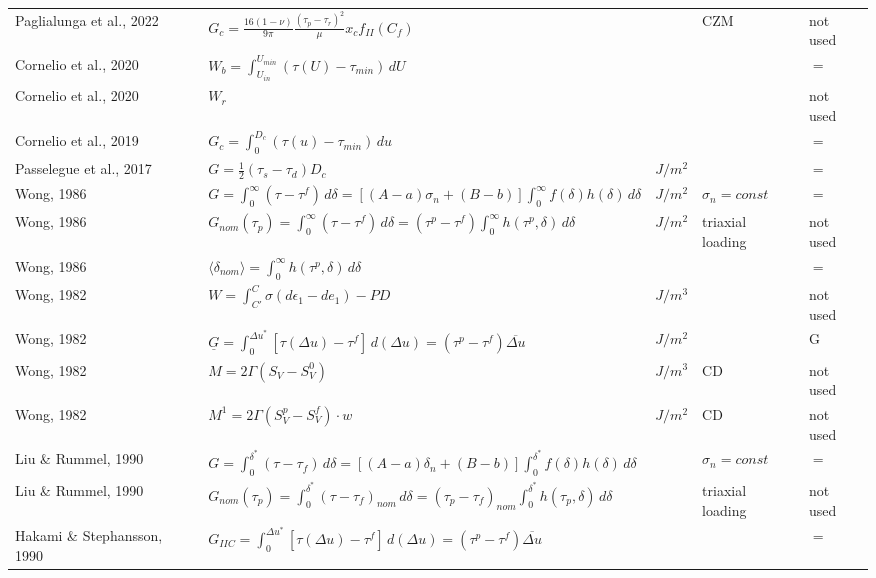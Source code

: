\documentclass{article}
\begin{document}
\begin{longtable}{|p{4 cm}|p{8 cm}|p{1.25 cm}|p{1.25 cm}|p{1.5 cm}|}
Paglialunga et al., 2022 & \( \displaystyle G_c = \frac{16(1-\nu)}{9\pi} \frac{(\tau_p-\tau_r)^2}{\mu} x_c f_{II} (C_f) \) & & CZM & not used \\
Cornelio et al., 2020 & \( \displaystyle W_b = \int_{U_{in}}^{U_{min}} (\tau(U) - \tau_{min}) \,d U \) & & & $=$ \\
Cornelio et al., 2020 & \( \displaystyle W_r \) & & & not used \\
Cornelio et al., 2019 & \( \displaystyle G_c = \int_{0}^{D_c} (\tau(u) - \tau_{min}) \,d u \) & & & $=$ \\
Passelegue et al., 2017 & \( \displaystyle G = \frac{1}{2} (\tau_s - \tau_d) D_c \) & $J/m^2$ & & $=$ \\
Wong, 1986 & \( \displaystyle G = \int_{0}^{\infty} (\tau - \tau^f) \,d \delta = [(A-a)\sigma_n + (B-b)] \int_{0}^{\infty} f(\delta) h(\delta) \,d \delta \) & $J/m^2$ & $\sigma_n = const $ & $=$ \\
Wong, 1986 & \( \displaystyle G_{nom}(\tau_p) = \int_{0}^{\infty} (\tau-\tau^f) \,d\delta = (\tau^p-\tau^f) \int_{0}^{\infty} h(\tau^p,\delta) \,d\delta \) & $J/m^2$ & triaxial loading & not used \\
Wong, 1986 & \( \displaystyle \langle \delta_{nom} \rangle = \int_{0}^{\infty} h(\tau^p,\delta) \,d\delta \) & & & $=$ \\
Wong, 1982 & \( \displaystyle W = \int_{C'}^{C} \sigma(d \epsilon_1 - d e_1) - P D \) & $J/m^3$ & & not used \\
Wong, 1982 & \( \displaystyle \underline{G} = \int_{0}^{\Delta u^*} [\tau(\Delta u) -\tau^f] \,d(\Delta u) = (\tau^p-\tau^f) \overline{\Delta u} \) & $J/m^2$ & & G \\
Wong, 1982 & \( \displaystyle M = 2 \Gamma (S_V - S_V^0) \) & $J/m^3$ & CD & not used \\
Wong, 1982 & \( \displaystyle M^1 = 2 \Gamma (S_V^p - S_V^f) \cdot w \) & $J/m^2$ & CD & not used \\
Liu \& Rummel, 1990 & \( \displaystyle G = \int_{0}^{\delta^*} (\tau - \tau_f) \,d\delta = [(A-a)\delta_n + (B-b)] \int_{0}^{\delta^*} f(\delta) h(\delta) \,d\delta \) & & $\sigma_n = const$ & $=$ \\
Liu \& Rummel, 1990 & \( \displaystyle G_{nom}(\tau_p) = \int_{0}^{\delta^*} (\tau - \tau_f)_{nom} \,d\delta = (\tau_p-\tau_f)_{nom} \int_{0}^{\delta^*} h(\tau_p,\delta) \,d\delta \) & & triaxial loading & not used \\
Hakami \& Stephansson, 1990 & \( \displaystyle G_{IIC} = \int_{0}^{\Delta u^*} [\tau(\Delta u) - \tau^f] \,d(\Delta u) = (\tau^p - \tau^f) \overline{\Delta u} \) & & & $=$ \\

\end{longtable}
\end{document}
